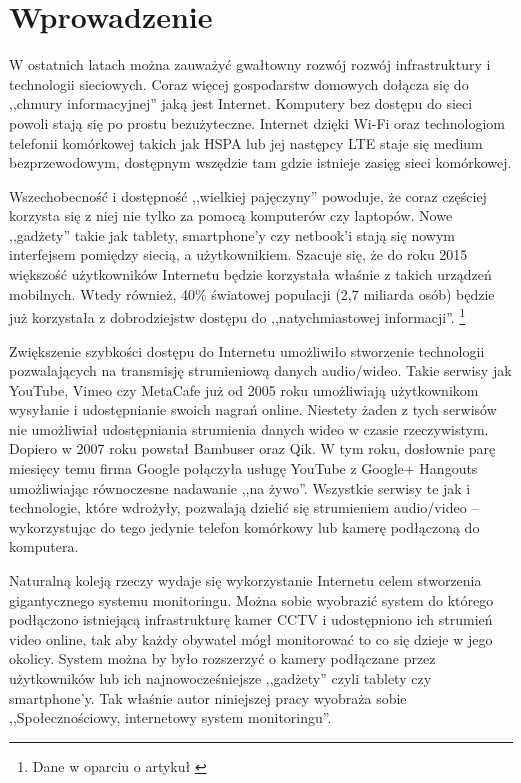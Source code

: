 \chapter{Wprowadzenie}
\label{cha:wprowadzenie}

W ostatnich latach można zauważyć gwałtowny rozwój rozwój infrastruktury i technologii sieciowych. Coraz więcej gospodarstw domowych dołącza się do ,,chmury informacyjnej'' jaką jest Internet. Komputery bez dostępu do sieci powoli stają się po prostu bezużyteczne. Internet dzięki Wi-Fi oraz technologiom telefonii komórkowej takich jak HSPA lub jej następcy LTE staje się medium bezprzewodowym, dostępnym wszędzie tam gdzie istnieje zasięg sieci komórkowej.

Wszechobecność i dostępność ,,wielkiej pajęczyny'' powoduje, że coraz częściej korzysta się z niej nie tylko za pomocą komputerów czy laptopów. Nowe ,,gadżety'' takie jak tablety, smartphone'y czy netbook'i stają się nowym interfejsem pomiędzy siecią, a użytkownikiem. Szacuje się, że do roku 2015 większość użytkowników Internetu będzie korzystała właśnie z takich urządzeń mobilnych. Wtedy również, 40\% światowej populacji (2,7 miliarda osób) będzie już korzystała z dobrodziejstw dostępu do ,,natychmiastowej informacji''. \footnote{Dane w oparciu o  artykuł \cite{Kim11}}

Zwiększenie szybkości dostępu do Internetu umożliwiło stworzenie technologii pozwalających na transmisję strumieniową danych audio/wideo. Takie serwisy jak YouTube, Vimeo czy MetaCafe już od 2005 roku umożliwiają użytkownikom wysyłanie i udostępnianie swoich nagrań online. Niestety żaden z tych serwisów nie umożliwiał udostępniania strumienia danych wideo w czasie rzeczywistym. Dopiero w 2007 roku powstał Bambuser oraz Qik. W tym roku, dosłownie parę miesięcy temu firma Google połączyła usługę YouTube z Google+ Hangouts umożliwiając równoczesne nadawanie ,,na żywo''. Wszystkie serwisy te jak i technologie, które wdrożyły, pozwalają dzielić się strumieniem audio/video -- wykorzystując do tego jedynie telefon komórkowy lub kamerę podłączoną do komputera.

Naturalną koleją rzeczy wydaje się wykorzystanie Internetu celem stworzenia gigantycznego systemu monitoringu. Można sobie wyobrazić system do którego podłączono istniejącą infrastrukturę kamer CCTV i udostępniono ich strumień video online, tak aby każdy obywatel mógł monitorować to co się dzieje w jego okolicy. System można by było rozszerzyć o kamery podłączane przez użytkowników lub ich najnowocześniejsze ,,gadżety'' czyli tablety czy smartphone'y. Tak właśnie autor niniejszej pracy wyobraża sobie ,,Społecznościowy, internetowy system monitoringu''.

